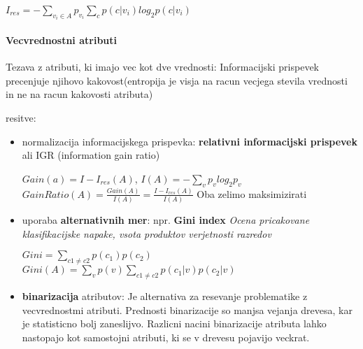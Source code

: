 \documentclass{article}
\begin{document}
\begin{multicols}{2}
\begin{center}
  \begin{math}
    I_{res} = - \sum_{v_i \in A} p_{v_i} \sum_c p(c|v_i) log_2 p(c|v_i)
  \end{math}
\end{center}

\paragraph{Vecvrednostni atributi}
Tezava z atributi, ki imajo vec kot dve vrednosti: Informacijski prispevek precenjuje
njihovo kakovost(entropija je visja na racun vecjega stevila vrednosti in ne na racun kakovosti atributa)

resitve:
\begin{itemize}
  \item normalizacija informacijskega prispevka: \textbf{relativni informacijski prispevek} ali IGR (information gain ratio)
    \begin{center}
      \begin{math}
        Gain(a) = I - I_{res}(A)
      \end{math},
      \begin{math}
        I(A) = - \sum_v p_v log_2 p_v
      \end{math}
      \begin{math}
        GainRatio(A) = \frac{Gain(A)}{I(A)} = \frac{I - I_{res}(A)}{I(A)}
      \end{math}
      Oba zelimo maksimizirati
    \end{center}
  
  \item uporaba \textbf{alternativnih mer}: npr. \textbf{Gini index}
    \textit{Ocena pricakovane klasifikacijske napake, vsota produktov verjetnosti razredov}
    \begin{center}
      \begin{math}
          Gini = \sum_{c1 \neq c2} p(c_1) p(c_2)
      \end{math}
      \begin{math}
          Gini(A) = \sum_{v} p(v) \sum_{c1 \neq c2} p(c_1 | v) p(c_2 | v)
      \end{math}
    \end{center}
  \item \textbf{binarizacija} atributov:
    Je alternativa za resevanje problematike z vecvrednostmi atributi.
    Prednosti binarizacije so manjsa vejanja drevesa, kar je statisticno bolj zaneslijvo. Razlicni nacini
    binarizacije atributa lahko nastopajo kot samostojni atributi, ki se v drevesu pojavijo veckrat.
\end{itemize}


\end{multicols}
\end{document}
